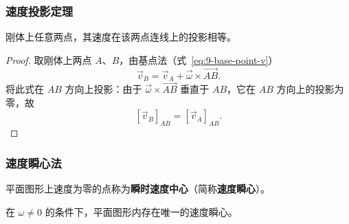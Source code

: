 \subsubsection{速度投影定理}

\begin{theorem}[速度投影定理]
刚体上任意两点，其速度在该两点连线上的投影相等。
\end{theorem}

\begin{proof}
取刚体上两点 $A$、$B$，由基点法（式~\eqref{eq:9-base-point-v}）
\begin{equation}\label{eq:9-proj-thm-vec}
  \vec{v}_B=\vec{v}_A+\vec{\omega}\times\vec{AB}.
\end{equation}
将此式在 $AB$ 方向上投影：由于 $\vec{\omega}\times\vec{AB}$ 垂直于 $AB$，它在 $AB$ 方向上的投影为零，故
\begin{equation}\label{eq:9-proj-thm}
  \left[\vec{v}_B\right]_{AB}=\left[\vec{v}_A\right]_{AB}.
\end{equation}
\end{proof}

\subsubsection{速度瞬心法}


\begin{definition}[速度瞬心]
平面图形上速度为零的点称为\textbf{瞬时速度中心}（简称\textbf{速度瞬心}）。
\end{definition}


\begin{theorem}[瞬心存在定理]
在 $\omega\neq 0$ 的条件下，平面图形内存在唯一的速度瞬心。
\end{theorem}


